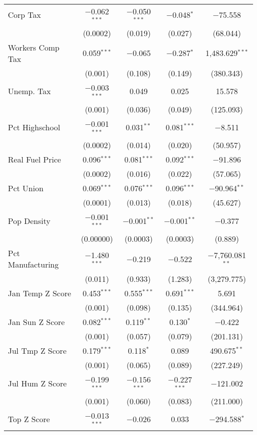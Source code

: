 \begin{table}[!htbp]
\begin{tabular}{@{\extracolsep{5pt}}lcccc}
  Corp Tax & $-$0.062$^{***}$ & $-$0.050$^{***}$ & $-$0.048$^{*}$ & $-$75.558 \\ 
  & (0.0002) & (0.019) & (0.027) & (68.044) \\ 
  Workers Comp Tax & 0.059$^{***}$ & $-$0.065 & $-$0.287$^{*}$ & 1,483.629$^{***}$ \\ 
  & (0.001) & (0.108) & (0.149) & (380.343) \\ 
  Unemp. Tax & $-$0.003$^{***}$ & 0.049 & 0.025 & 15.578 \\ 
  & (0.001) & (0.036) & (0.049) & (125.093) \\ 
  Pct Highschool & $-$0.001$^{***}$ & 0.031$^{**}$ & 0.081$^{***}$ & $-$8.511 \\ 
  & (0.0002) & (0.014) & (0.020) & (50.957) \\ 
  Real Fuel Price & 0.096$^{***}$ & 0.081$^{***}$ & 0.092$^{***}$ & $-$91.896 \\ 
  & (0.0002) & (0.016) & (0.022) & (57.065) \\ 
  Pct Union & 0.069$^{***}$ & 0.076$^{***}$ & 0.096$^{***}$ & $-$90.964$^{**}$ \\ 
  & (0.0001) & (0.013) & (0.018) & (45.627) \\ 
  Pop Density & $-$0.001$^{***}$ & $-$0.001$^{**}$ & $-$0.001$^{**}$ & $-$0.377 \\ 
  & (0.00000) & (0.0003) & (0.0003) & (0.889) \\ 
  Pct Manufacturing & $-$1.480$^{***}$ & $-$0.219 & $-$0.522 & $-$7,760.081$^{**}$ \\ 
  & (0.011) & (0.933) & (1.283) & (3,279.775) \\ 
  Jan Temp Z Score & 0.453$^{***}$ & 0.555$^{***}$ & 0.691$^{***}$ & 5.691 \\ 
  & (0.001) & (0.098) & (0.135) & (344.964) \\ 
  Jan Sun Z Score & 0.082$^{***}$ & 0.119$^{**}$ & 0.130$^{*}$ & $-$0.422 \\ 
  & (0.001) & (0.057) & (0.079) & (201.131) \\ 
  Jul Tmp Z Score & 0.179$^{***}$ & 0.118$^{*}$ & 0.089 & 490.675$^{**}$ \\ 
  & (0.001) & (0.065) & (0.089) & (227.249) \\ 
  Jul Hum Z Score & $-$0.199$^{***}$ & $-$0.156$^{***}$ & $-$0.227$^{***}$ & $-$121.002 \\ 
  & (0.001) & (0.060) & (0.083) & (211.000) \\ 
  Top Z Score & $-$0.013$^{***}$ & $-$0.026 & 0.033 & $-$294.588$^{*}$ \\ 

\end{tabular}
\end{table}
